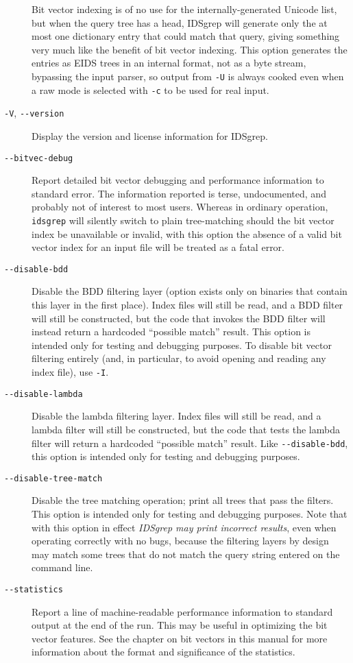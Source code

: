 \documentclass[twocolumn]{report}
\newcommand{\DangerousBend}{\marginpar{\large\hfill\dbend\hfill\null}}
\begin{document}
\begin{description}
Bit \DangerousBend vector indexing is of no use for the internally-generated
Unicode list, but when the query tree has a head, IDSgrep will generate
only the at most one dictionary entry that could match that query, giving
something very much like the benefit of bit vector indexing.
This option generates the entries as EIDS trees in an internal format,
not as a byte stream, bypassing the input parser,
so output from \texttt{-U}
is always cooked even when a raw mode is selected with
\texttt{-c} to be used for real input.

\item[\texttt{-V}, \texttt{-{}-version}] Display the version and license
information for IDSgrep.

\item[\texttt{-{}-bitvec-debug}]
Report \DangerousBend detailed bit vector debugging and performance
information to standard error.
The information reported is terse, undocumented, and probably not of
interest to most users.
Whereas in ordinary operation, \texttt{idsgrep}
will silently switch to plain tree-matching should the bit vector index
be unavailable or invalid, with this option the
absence of a valid bit vector index for an input file will be
treated as a fatal error.

\item[\texttt{-{}-disable-bdd}]
Disable \DangerousBend the BDD filtering layer (option exists only on
binaries that contain this layer in the first place).
Index files will still be read, and a BDD filter will still be
constructed, but the code that invokes the BDD filter will instead
return a hardcoded ``possible match'' result.
This option is intended only for testing and debugging purposes.
To disable bit vector filtering entirely (and, in particular, to
avoid opening and reading any index file), use \texttt{-I}.

\item[\texttt{-{}-disable-lambda}]
Disable \DangerousBend the lambda filtering layer.
Index files will still be read, and a lambda filter will still be
constructed, but the code that tests the lambda filter
will return a hardcoded ``possible match'' result.
Like \texttt{-{}-disable-bdd},
this option is intended only for testing and debugging purposes.

\item[\texttt{-{}-disable-tree-match}]
Disable \DangerousBend the tree matching operation; print all trees that
pass the filters.
This option is intended only for testing and debugging purposes.
Note that with this option in effect \emph{IDSgrep may print incorrect
results}, even when operating correctly with no bugs, because the filtering
layers by design may match some trees that do not match the query string
entered on the command line.

\item[\texttt{-{}-statistics}]
Report \DangerousBend a line of machine-readable performance information
to standard output at the end of the run.  This may be useful in
optimizing the bit vector features.  See the chapter on bit vectors in this
manual for more information about the format and significance of the
statistics.

\end{description}
\end{document}
